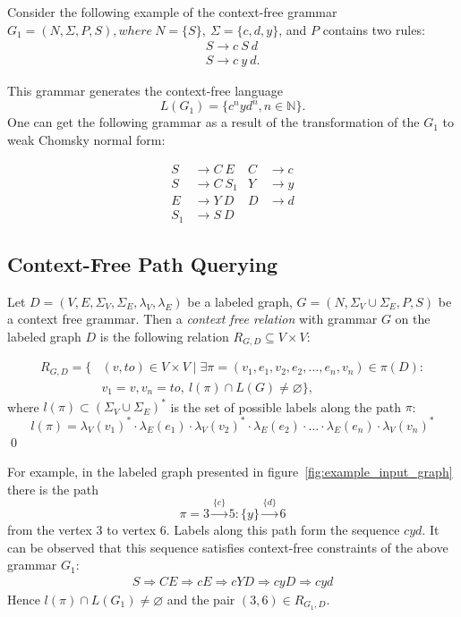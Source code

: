 Consider the following example of the context-free grammar $G_1=(N, \Sigma, P, S), where ~N=\{S\},~\Sigma=\{c, d, y\}$, and $P$ contains two rules: 
\begin{align*}
S \rightarrow c \ S \ d\\
S \rightarrow c \ y \ d.
\end{align*}

This grammar generates the context-free language $$L(G_1) = \{c^nyd^n, n \in \mathbb{N}\}.$$
One can get the following grammar as a result of the transformation of the $G_1$ to weak Chomsky normal form:

\begin{align*}
S& \to C \ E   & C& \to c   \\
S& \to C \ S_1 & Y& \to y   \\
E& \to Y \ D   & D& \to d   \\ 
S_1& \to S \ D &&
\end{align*}


\subsection{Context-Free Path Querying}

\begin{definition}
Let $D = (V, E, \Sigma_V, \Sigma_E, \lambda_V, \lambda_E)$ be a labeled graph, $G = (N, \Sigma_V \cup \Sigma_E, P, S)$ be a context free grammar. Then a \emph{context free relation} with grammar $G$ on the labeled graph $D$ is the following relation $R_{G, D} \subseteq V \times V$:

\begin{equation*} \label{eq1}
\begin{split}
R_{G, D} = \{&(v, to) \in V \times V \mid \exists \pi = (v_1, e_1, v_2, e_2, \ldots, e_n, v_n) \in \pi(D): \\
      &v_1 = v, v_n = to,~l(\pi) \cap L(G) \neq \varnothing \},
\end{split}
\end{equation*}
where $l(\pi) \subset (\Sigma_V \cup \Sigma_E)^*$ is the set of possible labels along the path $\pi$:
$$l(\pi) = \lambda_V(v_1)^* \cdot \lambda_E(e_1) \cdot \lambda_V(v_2)^* \cdot \lambda_E(e_2) \cdot \ldots \cdot \lambda_E(e_n) \cdot \lambda_V(v_n)^*$$
\qed
\end{definition}


For example, in the labeled graph presented in figure~\ref{fig:example_input_graph} there is the path $$\pi=3 \xrightarrow{\{c\}} 5:\{y\} \xrightarrow{\{d\}} 6$$ from the vertex 3 to vertex 6.
Labels along this path form the sequence $cyd$.
It can be observed that this sequence satisfies context-free constraints of the above grammar $G_1$:
    \begin{align*}
         S \Rightarrow CE \Rightarrow cE \Rightarrow cYD \Rightarrow cyD \Rightarrow cyd
    \end{align*}
Hence $l(\pi) \cap L(G_1) \neq \varnothing$ and the pair $(3,6) \in R_{G_1, D}$.


